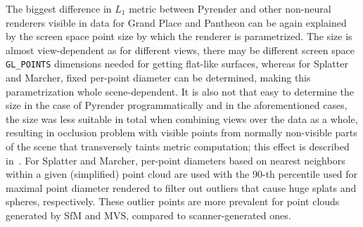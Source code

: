 The biggest difference in $L_1$ metric between Pyrender and other non-neural
renderers visible in data for Grand Place and Pantheon can be again explained
by the screen space point size by which the renderer is parametrized. The size
is almost view-dependent as for different views, there may be different screen
space \verb|GL_POINTS| dimensions needed for getting flat-like surfaces, whereas
for Splatter and Marcher, fixed per-point diameter can be determined, making this
parametrization whole scene-dependent. It is also not that easy to determine
the size in the case of Pyrender programmatically and in the aforementioned
cases, the size was less suitable in total when combining views over the data
as a whole, resulting in occlusion problem with visible points from normally
non-visible parts of the scene that transversely taints metric computation;
this effect is described in~. For Splatter and Marcher,
per-point diameters based on nearest neighbors within a given (simplified) point
cloud are used with the 90-th percentile used for maximal point diameter rendered
to filter out outliers that cause huge splats and spheres, respectively. These
outlier points are more prevalent for point clouds generated by SfM and MVS,
compared to scanner-generated ones.\\

